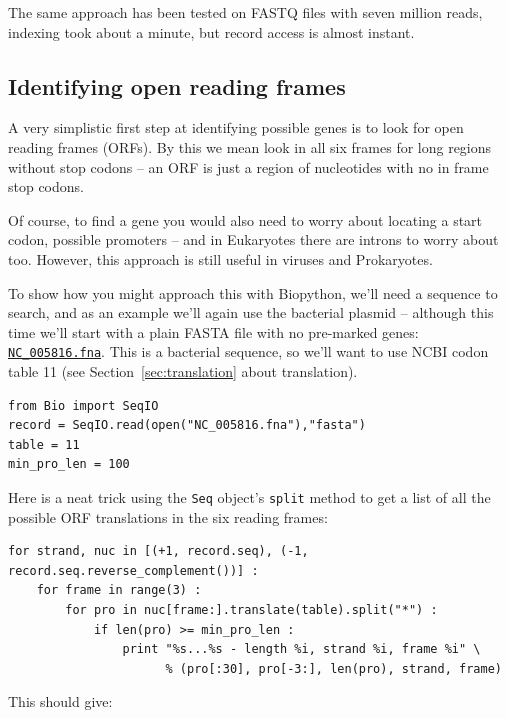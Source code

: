 \documentclass{report}
\begin{document}
The same approach has been tested on FASTQ files with seven million reads,
indexing took about a minute, but record access is almost instant.

\subsection{Identifying open reading frames}

A very simplistic first step at identifying possible genes is to look for
open reading frames (ORFs).  By this we mean look in all six frames for long
regions without stop codons -- an ORF is just a region of nucleotides with
no in frame stop codons.

Of course, to find a gene you would also need to worry about locating a start
codon, possible promoters -- and in Eukaryotes there are introns to worry about
too.  However, this approach is still useful in viruses and Prokaryotes.

To show how you might approach this with Biopython, we'll need a sequence to
search, and as an example we'll again use the bacterial plasmid -- although
this time we'll start with a plain FASTA file with no pre-marked genes:
\href{http://biopython.org/SRC/biopython/Tests/GenBank/NC_005816.fna}
{\texttt{NC\_005816.fna}}. This is a bacterial sequence, so we'll want to use
NCBI codon table 11 (see Section~\ref{sec:translation} about translation).

\begin{verbatim}
from Bio import SeqIO 
record = SeqIO.read(open("NC_005816.fna"),"fasta")
table = 11
min_pro_len = 100
\end{verbatim}

Here is a neat trick using the \verb|Seq| object's \verb|split| method to
get a list of all the possible ORF translations in the six reading frames:

\begin{verbatim}
for strand, nuc in [(+1, record.seq), (-1, record.seq.reverse_complement())] :
    for frame in range(3) :
        for pro in nuc[frame:].translate(table).split("*") :
            if len(pro) >= min_pro_len :
                print "%s...%s - length %i, strand %i, frame %i" \
                      % (pro[:30], pro[-3:], len(pro), strand, frame)
\end{verbatim}

\noindent This should give:
\end{document}
